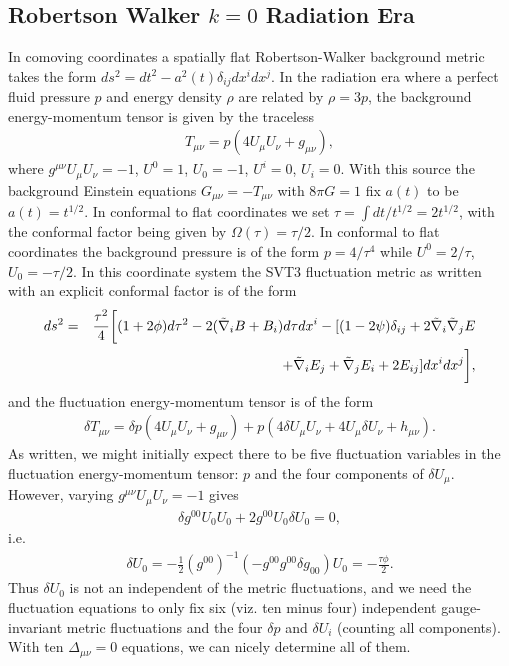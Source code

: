 \subsection{Robertson Walker $k=0$ Radiation Era}
\label{ss:rw_k=0_radiation_svt3}
\label{S8}
In comoving coordinates a spatially flat Robertson-Walker background metric takes the form $ds^2=dt^2-a^2(t)\delta_{ij}dx^idx^j$. In the radiation era where a perfect fluid pressure $p$ and energy density $\rho$ are related by $\rho=3p$, the background energy-momentum tensor is given by the traceless
%
\begin{eqnarray}
T_{\mu\nu}=p(4U_{\mu}U_{\nu}+g_{\mu\nu}),
\label{8.1}
\end{eqnarray}
%
where $g^{\mu\nu}U_{\mu}U_{\nu}=-1$, $U^{0}=1$, $U_0=-1$, $U^{i}=0$, $U_i=0$. With this source the background Einstein equations $G_{\mu\nu}=-T_{\mu\nu}$ with $8\pi G=1$ fix $a(t)$ to be $a(t)=t^{1/2}$. In conformal to flat coordinates we set $\tau=\int dt/t^{1/2}=2t^{1/2}$, with the conformal factor being given by $\Omega(\tau)=\tau/2$. In conformal to flat coordinates the background pressure is of the form $p=4/\tau^4$ while $U^{0}=2/\tau$, $U_0=-\tau/2$. In this coordinate system the SVT3 fluctuation metric as written with an explicit conformal factor is of the form 
%
\begin{eqnarray}
ds^2 &=&\frac{\tau^2}{4}\bigg{[}(1+2\phi) d\tau^2 -2(\tilde{\nabla}_i B +B_i)d\tau dx^i - [(1-2\psi)\delta_{ij} +2\tilde{\nabla}_i\tilde{\nabla}_j E
\nonumber\\
&& + \tilde{\nabla}_i E_j + \tilde{\nabla}_j E_i + 2E_{ij}]dx^i dx^j\bigg{]},
\label{8.2}
\end{eqnarray}
%
and the fluctuation energy-momentum tensor is of the form
%
\begin{eqnarray}
\delta T_{\mu\nu}=\delta p(4U_{\mu}U_{\nu}+g_{\mu\nu})+p(4\delta U_{\mu}U_{\nu}+4U_{\mu}\delta U_{\nu}+h_{\mu\nu}).
\label{8.3}
\end{eqnarray}
%
As written, we might initially expect there to be five fluctuation variables in the fluctuation energy-momentum tensor: $p$ and the four components of $\delta U_{\mu}$. However, varying  $g^{\mu\nu}U_{\mu}U_{\nu}=-1$ gives 
%
\begin{eqnarray}
\delta g^{00}U_{0}U_{0}+2g^{00}U_{0}\delta U_{0}=0,
\label{8.4}
\end{eqnarray}
%
i.e. 
%
\begin{eqnarray}
\delta U_{0}=-\frac{1}{2}(g^{00})^{-1}(-g^{00}g^{00}\delta g_{00})U_{0}=-\frac{\tau\phi}{2}.
\label{8.5}
\end{eqnarray}
%
Thus $\delta U_{0}$ is not an independent of the metric fluctuations, and we need the fluctuation equations to only fix six (viz. ten minus four) independent gauge-invariant metric fluctuations and the  four $\delta p$ and $\delta U_i$ (counting all components). With ten $\Delta_{\mu\nu}=0$ equations, we can nicely determine all of them. 


